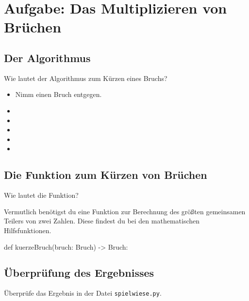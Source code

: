 \section{Aufgabe: Das Multiplizieren von Brüchen}

\subsection*{Der Algorithmus}

Wie lautet der Algorithmus zum Kürzen eines Bruchs?

{\huge
	\begin{itemize}
		\item Nimm einen Bruch entgegen. 
		\item  
		\item  
		\item  
		\item  
		\item  
	\end{itemize}
}

\subsection*{Die Funktion zum Kürzen von Brüchen}

Wie lautet die Funktion?

Vermutlich benötigst du eine Funktion zur Berechnung des größten gemeinsamen Teilers von zwei Zahlen. Diese findest du bei den mathematischen Hilfsfunktionen.

\begin{codePython}
	def kuerzeBruch(bruch: Bruch) -> Bruch:
\end{codePython}


\subsection*{Überprüfung des Ergebnisses}

Überprüfe das Ergebnis in der Datei \texttt{spielwiese.py}.
